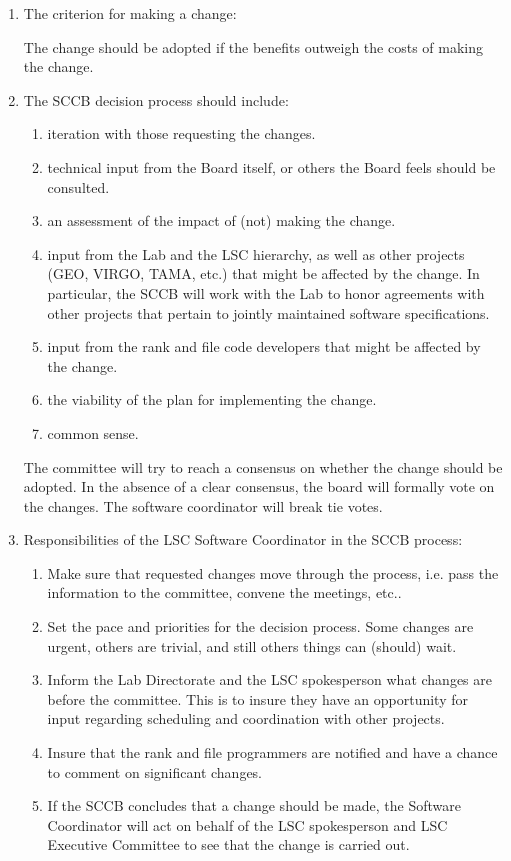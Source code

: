 \documentclass[]{ligodcc}
\begin{document}
\begin{enumerate}
\item
The criterion for making a change:

The change should be adopted if the benefits outweigh the costs of
making the change.

\item
The SCCB decision process should include:
\begin{enumerate}
   \item
   iteration with those requesting the changes.
   \item
   technical input from the Board itself, or others
   the Board feels should be consulted.
   \item
   an assessment of the impact of (not) making the change.
   \item
   input from the Lab and the LSC hierarchy, as well as
   other projects (GEO, VIRGO, TAMA, etc.) that might be affected
   by the change. In particular, the SCCB will work with the Lab to honor
   agreements with other projects that pertain to jointly maintained
   software specifications.
   \item
   input from the rank and file code developers that might be affected
   by the change.
   \item
   the viability of the plan for implementing the change.
   \item
   common sense.
\end{enumerate}

The committee will try to reach a consensus on whether the change
should be adopted.  In the absence of a clear consensus, the board
will formally vote on the changes. The software coordinator will break
tie votes.

\item
Responsibilities of the LSC Software Coordinator in the SCCB process:
\begin{enumerate}
   \item
   Make sure that requested changes move through the process, i.e.
   pass the information to the committee, convene the meetings, etc..
   \item
   Set the pace and priorities for the decision process. Some changes are
   urgent, others are trivial, and still others things can (should) wait.
   \item
   Inform the Lab Directorate and the LSC  spokesperson what changes are
   before the committee. This is to insure they have an opportunity for
   input regarding scheduling and coordination with other projects.
   \item
   Insure that the rank and file programmers are notified and have
   a chance to comment on significant changes.
   \item
   If the SCCB concludes that a change should be made, the Software
   Coordinator will act on behalf of the LSC spokesperson and
   LSC Executive Committee to see that the change is carried out.
\end{enumerate}

\end{enumerate}
\end{document}
